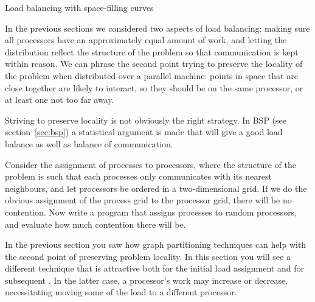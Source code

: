  {Load balancing with space-filling curves}
\label{sec:space-filling}

In the previous sections we considered two aspects of load balancing:
making sure all processors have an approximately equal amount of work,
and letting the distribution reflect the structure of the problem so
that communication is kept within reason. We can phrase the second
point trying to preserve the locality of the problem when
distributed over a parallel machine: points in space that are close together
are likely to interact, so they should be on the same processor, or
at least one not too far away.

Striving to preserve locality is not obviously the right strategy. In
\ac{BSP} (see section~\ref{sec:bsp}) a statistical argument is made
that  will give a good load balance as
well as balance of communication.

\begin{exercise}
  Consider the assignment of processes to processors, where the
  structure of the problem is such that 
  each processes only communicates with its
  nearest neighbours, and let processors be ordered in a
  two-dimensional grid. If we do the obvious assignment of the process
  grid to the processor grid, there will be no contention. Now write a
  program that assigns processes to random processors, and evaluate
  how much contention there will be.
\end{exercise}

In the previous section you saw how graph partitioning techniques can
help with the second point of preserving problem locality. In this
section you will see a different technique that is attractive both for
the initial load assignment and for subsequent
. In the latter case, a processor's
work may increase or decrease, necessitating moving some of the load
to a different processor.

